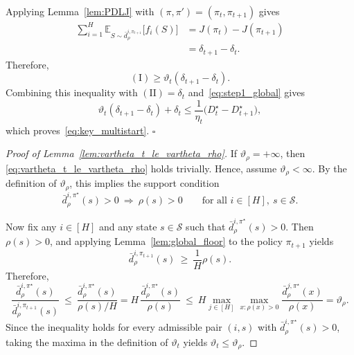 \documentclass[11pt]{article}
\begin{document}
Applying Lemma~\ref{lem:PDLJ} with
$(\pi,\pi')=(\pi_t,\pi_{t+1})$ gives
\begin{align*}
\sum_{i=1}^H
\mathbb E_{S\sim\bar d^{i,\pi_{t+1}}_\rho}
\bigl[f_i(S)\bigr]
&=
J(\pi_t)-J(\pi_{t+1})\\
&=
\delta_{t+1}-\delta_t.
\end{align*}
Therefore,
\[
(\mathrm I)
\ge
\vartheta_t(\delta_{t+1}-\delta_t).
\]
Combining this inequality with
$(\mathrm{II})=\delta_t$ and~\eqref{eq:step1_global} gives
\[
\vartheta_t(\delta_{t+1}-\delta_t)+\delta_t
\le
\frac{1}{\eta_t}
\bigl(D_t^\star-D_{t+1}^\star\bigr),
\]
which proves~\eqref{eq:key_multistart}.
\hfill
$\square$

\begin{proof} [Proof of Lemma~\ref{lem:vartheta_t_le_vartheta_rho}]
If $\vartheta_\rho=+\infty$, then \eqref{eq:vartheta_t_le_vartheta_rho} holds trivially. Hence, assume
$\vartheta_\rho<\infty$. By the definition of $\vartheta_\rho$, this implies the support condition
\[
\bar d^{i,\pi^\star}_\rho(s)>0 \ \Longrightarrow\ \rho(s)>0
\qquad \text{for all } i\in[H],\ s\in\mathcal S.
\]

Now fix any $i\in[H]$ and any state $s\in\mathcal S$ such that $\bar d^{i,\pi^\star}_\rho(s)>0$. Then $\rho(s)>0$, and applying Lemma~\ref{lem:global_floor} to the policy $\pi_{t+1}$ yields
\begin{equation}
\label{eq:lower_bar_d_pi_t1}
\bar d^{i,\pi_{t+1}}_\rho(s)\ \ge\ \frac{1}{H}\rho(s).
\end{equation}
Therefore,
\[
\frac{\bar d^{i,\pi^\star}_\rho(s)}{\bar d^{i,\pi_{t+1}}_\rho(s)}
\ \le\
\frac{\bar d^{i,\pi^\star}_\rho(s)}{\rho(s)/H}
=
H\,\frac{\bar d^{i,\pi^\star}_\rho(s)}{\rho(s)}
\ \le\
H\max_{j\in[H]}\max_{x:\rho(x)>0}\frac{\bar d^{j,\pi^\star}_\rho(x)}{\rho(x)}
=
\vartheta_\rho.
\]
Since the inequality holds for every admissible pair $(i,s)$ with $\bar d^{i,\pi^\star}_\rho(s)>0$,
taking the maxima in the definition of $\vartheta_t$ yields $\vartheta_t\le \vartheta_\rho$.
\end{proof}
\end{document}
